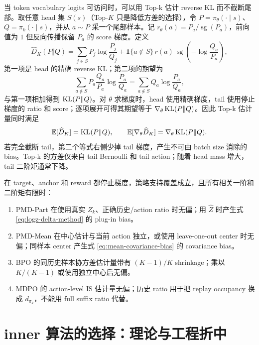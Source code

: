 当 token vocabulary logits 可访问时，可以用 Top-k 估计 reverse KL 而不截断尾部。取任意 head 集 $S(s)$（Top-$K$ 只是降低方差的选择），令 $P=\pi_\theta(\cdot\mid s)$、$Q=\pi_k(\cdot\mid s)$，并从 $a\sim P$ 采一个尾部样本。记 $r_\theta(a)=P_a/\operatorname{sg}(P_a)$，前向值为 $1$ 但反向传播保留 $P_a$ 的 score 梯度。定义
\begin{equation}
\label{eq:topk-reverse-kl-estimator}
 \widehat D_{K}(P\Vert Q)
 =\sum_{j\in S}P_j\log\frac{P_j}{Q_j}
 +\mathbf 1\{a\notin S\}\,r(a)\,\operatorname{sg}\!\left(-\log\frac{Q_a}{P_a}\right),
\end{equation}
第一项是 head 的精确 reverse KL；第二项的期望为
\[
 \sum_{a\notin S}P_a\frac{Q_a}{P_a}\log\frac{P_a}{Q_a}
 =\sum_{a\notin S}Q_a\log\frac{P_a}{Q_a},
\]
与第一项相加得到 $\operatorname{KL}(P\Vert Q)$。对 $\theta$ 求梯度时，head 使用精确梯度，tail 使用停止梯度的 ratio 和 score；逐项展开可得其期望等于 $\nabla_\theta\operatorname{KL}(P\Vert Q)$。因此 Top-k 估计量同时满足
\[
 \mathbb E[\widehat D_K]=\operatorname{KL}(P\Vert Q),
 \qquad
 \mathbb E[\nabla_\theta\widehat D_K]=\nabla_\theta\operatorname{KL}(P\Vert Q).
\]
若完全截断 tail，第二个等式右侧少掉 tail 梯度，产生不可由 batch size 消除的 bias。Top-k 的方差仅来自 tail Bernoulli 和 tail action；随着 head mass 增大，tail 二阶矩通常下降。

\begin{proposition}
\label{prop:four-inner-unbiased}
在 target、anchor 和 reward 都停止梯度，策略支持覆盖成立，且所有相关一阶和二阶矩有限时：
\begin{enumerate}[label=(\roman*)]
 \item PMD-Part 在使用真实 $Z_k$、正确历史/action ratio 时无偏；用 $\widehat Z$ 时产生式 \eqref{eq:logz-delta-method} 的 plug-in bias。
 \item PMD-Mean 在中心估计与当前 action 独立，或使用 leave-one-out center 时无偏；同样本 center 产生式 \eqref{eq:mean-covariance-bias} 的 covariance bias。
 \item BPO 的同历史样本协方差估计量带有 $(K-1)/K$ shrinkage；乘以 $K/(K-1)$ 或使用独立中心后无偏。
 \item MDPO 的 action-level IS 估计量无偏；历史 ratio 用于把 replay occupancy 换成 $d_{\pi_k}$，不能用 full suffix ratio 代替。
\end{enumerate}
\end{proposition}

\section{inner 算法的选择：理论与工程折中}
\label{sec:ch2-inner-choice}

